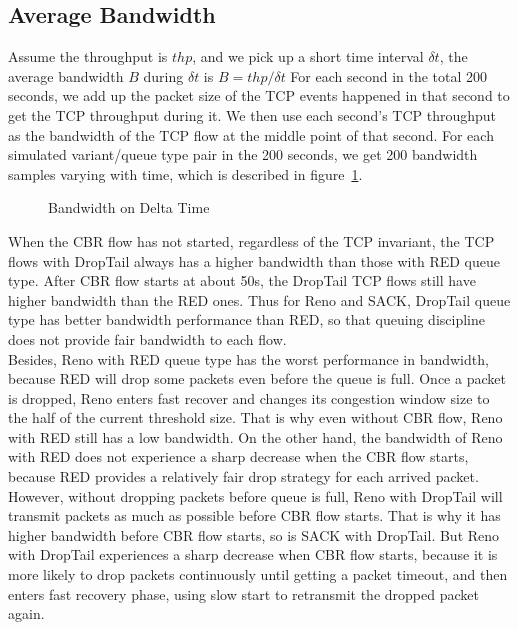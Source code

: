 \documentclass[10pt, conference]{lib/IEEEtran}
\begin{document}
\subsection{Average Bandwidth}
Assume the throughput is $thp$, and we pick up a short time interval $\delta t$, the average bandwidth $B$ during 
$\delta t$ is $B = thp / \delta t$ For each second in the total 200 seconds, we add up the packet size of the TCP 
events happened in that second to get the TCP throughput during it. We then use each second's TCP throughput as the 
bandwidth of the TCP flow at the middle point of that second. For each simulated variant/queue type pair in the 200 
seconds, we get 200 bandwidth samples varying with time, which is described in figure~\ref{fig:exp3_thp}.\\
\begin{figure}[!htb]
    \centering
    \resizebox{0.9\linewidth}{!}{}
    \caption{Bandwidth on Delta Time}
    \label{fig:exp3_thp}
\end{figure}
When the CBR flow has not started, regardless of the TCP invariant, the TCP flows with DropTail always has a higher 
bandwidth than those with RED queue type. After CBR flow starts at about 50s, the DropTail TCP flows still have higher 
bandwidth than the RED ones. Thus for Reno and SACK, DropTail queue type has better bandwidth performance than RED, 
so that queuing discipline does not provide fair bandwidth to each flow.\\
Besides, Reno with RED queue type has the worst performance in bandwidth, because RED will drop some packets even 
before the queue is full. Once a packet is dropped, Reno enters fast recover and changes its congestion window size 
to the half of the current threshold size. That is why even without CBR flow, Reno with RED still has a low bandwidth. 
On the other hand, the bandwidth of Reno with RED does not experience a sharp decrease when the CBR flow starts, because 
RED provides a relatively fair drop strategy for each arrived packet.\\
However, without dropping packets before queue is full, Reno with DropTail will transmit packets as much as possible 
before CBR flow starts. That is why it has higher bandwidth before CBR flow starts, so is SACK with DropTail. But Reno 
with DropTail experiences a sharp decrease when CBR flow starts, because it is more likely to drop packets continuously 
until getting a packet timeout, and then enters fast recovery phase, using slow start to retransmit the dropped packet 
again.\\
\end{document}
